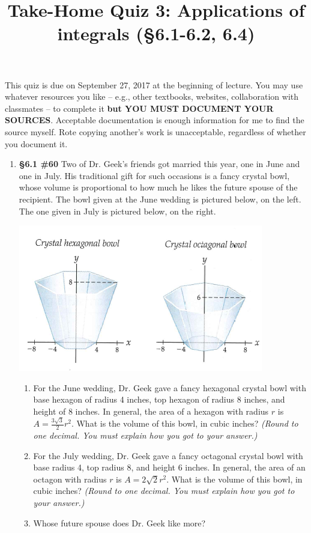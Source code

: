 \documentclass[%
]{article}
\title{\vspace{-3.5pc} 
	\flushleft \bf \Large Take-Home Quiz 3: Applications of integrals %
	 (\S6.1-6.2, 6.4)}
\date{}
\begin{document}
\maketitle

\vspace{-3pc}
 This quiz is due on September 27, 2017 at the beginning of lecture.  You may use whatever resources you like -- e.g., other textbooks, websites, collaboration with classmates -- to complete it \textbf{but YOU MUST DOCUMENT YOUR SOURCES}.  Acceptable documentation is enough information for me to find the source myself.  Rote copying another's work is unacceptable, regardless of whether you document it.  

\noindent\hrulefill

\begin{enumerate}
\item {\bf \S6.1 \#60} Two of Dr. Geek's friends got married this year, one in June and one in July.  His traditional gift for such occasions is a fancy crystal bowl, whose volume is proportional to how much he likes the future spouse of the recipient.  The bowl given at the June wedding is pictured below, on the left.  The one given in July is pictured below, on the right. 
\vspace{-0.5pc}
\begin{center}
\includegraphics[scale=0.75]{6-1_60TaalmanKohn}
\end{center}
	\begin{enumerate}
	\item For the June wedding, Dr. Geek gave a fancy hexagonal crystal bowl with base hexagon of radius 4 inches, top hexagon of radius 8 inches, and height of 8 inches.  In general, the area of a hexagon with radius $r$ is $A=\frac{3\sqrt 3}{2}r^2$.  What is the volume of this bowl, in cubic inches?  \textit{(Round to one decimal.  You must explain how you got to your answer.)}
	\item For the July wedding, Dr. Geek gave a fancy octagonal crystal bowl with base radius 4, top radius 8, and height 6 inches.  In general, the area of an octagon with radius $r$ is $A=2\sqrt 2 r^2$.  What is the volume of this bowl, in cubic inches?  \textit{(Round to one decimal.  You must explain how you got to your answer.)}
	\item Whose future spouse does Dr. Geek like more?
	\end{enumerate}


\end{enumerate}
\end{document}
